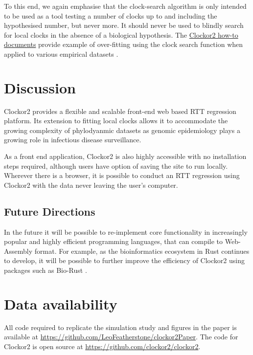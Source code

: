 \documentclass{article}
\begin{document}
To this end, we again emphasise that the clock-search algorithm is only intended to be used as a tool testing a number of clocks up to and including the hypothesised number, but never more. It should never be used to blindly search for local clocks in the absence of a biological hypothesis. The \href{https://clockor2.github.io/clockor2/}{Clockor2 how-to documents} provide example of over-fitting using the clock search function when applied to various empirical datasets \citep{porter2023evolutionary,dudas_mers-cov_2018}.

\section*{Discussion}
Clockor2 provides a flexible and scalable front-end web based RTT regression platform. Its extension to fitting local clocks allows it to accommodate the growing complexity of phylodyanmic datasets as genomic epidemiology plays a growing role in infectious disease surveillance. 

As a front end application, Clockor2 is also highly accessible with no installation steps required, although users have option of saving the site to run locally. Wherever there is a browser, it is possible to conduct an RTT regression using Clockor2 with the data never leaving the user's computer.

\subsection*{Future Directions}
In the future it will be possible to re-implement core functionality in increasingly popular and highly efficient programming languages, that can compile to Web-Assembly format. For example, as the bioinformatics ecosystem in Rust continues to develop, it will be possible to further improve the efficiency of Clockor2 using packages such as Bio-Rust \citep{koester_rust-bio-2015}.


\section*{Data availability}
All code required to replicate the simulation study and figures in the paper is available at \url{https://github.com/LeoFeatherstone/clockor2Paper}. The code for Clockor2 is open source at \url{https://github.com/clockor2/clockor2}.


\end{document}
